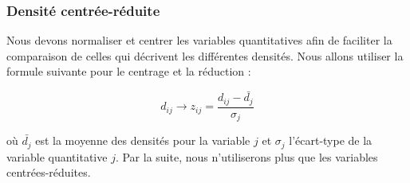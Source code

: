 \documentclass[
]{article}
\begin{document}
\hypertarget{densituxe9-centruxe9e-ruxe9duite}{%
\subsubsection{Densité
centrée-réduite}\label{densituxe9-centruxe9e-ruxe9duite}}

Nous devons normaliser et centrer les variables quantitatives afin de
faciliter la comparaison de celles qui décrivent les différentes
densités. Nous allons utiliser la formule suivante pour le centrage et
la réduction :

\[
d_{ij}\rightarrow z_{ij} = \frac{d_{ij} - \bar{d_{j}}}{\sigma_{j}}
\]

où \(\bar{d_{j}}\) est la moyenne des densités pour la variable \(j\) et
\(\sigma_{j}\) l'écart-type de la variable quantitative \(j\). Par la
suite, nous n'utiliserons plus que les variables centrées-réduites.
\end{document}
